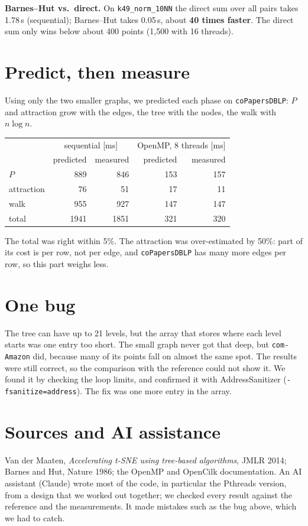 \documentclass[11pt,a4paper]{article}
\newcommand{\code}[1]{\texttt{#1}}
\begin{document}
\textbf{Barnes--Hut vs.\ direct.} On \code{k49\_norm\_10NN} the direct
sum over all pairs takes 1.78\,s (sequential); Barnes--Hut takes
0.05\,s, about \textbf{40 times faster}. The direct sum only wins below
about 400 points (1{,}500 with 16 threads).

\section{Predict, then measure}

Using only the two smaller graphs, we predicted each phase on
\code{coPapersDBLP}: $P$ and attraction grow with the edges, the tree with
the nodes, the walk with $n\log n$.

\begin{center}
\begin{tabular}{lrrrr}
\toprule
 & \multicolumn{2}{c}{sequential [ms]} & \multicolumn{2}{c}{OpenMP, 8 threads [ms]} \\
 & predicted & measured & predicted & measured \\
\midrule
$P$        & 889  & 846  & 153 & 157 \\
attraction & 76   & 51   & 17  & 11  \\
walk       & 955  & 927  & 147 & 147 \\
\midrule
total      & 1941 & 1851 & 321 & 320 \\
\bottomrule
\end{tabular}
\end{center}

The total was right within 5\%. The attraction was over-estimated by
50\%: part of its cost is per row, not per edge, and \code{coPapersDBLP}
has many more edges per row, so this part weighs less.

\section{One bug}

The tree can have up to 21 levels, but the array that stores where each
level starts was one entry too short. The small graph never got that deep,
but \code{com-Amazon} did, because many of its points fall on almost the
same spot. The results were still correct, so the comparison with the
reference could not show it. We found it by checking the loop limits, and
confirmed it with AddressSanitizer (\code{-fsanitize=address}). The fix
was one more entry in the array.

\section{Sources and AI assistance}

Van der Maaten, \emph{Accelerating t-SNE using tree-based algorithms},
JMLR 2014; Barnes and Hut, Nature 1986; the OpenMP and OpenCilk
documentation.
An AI assistant (Claude) wrote most of the code, in particular the
Pthreads version, from a design that we worked out together; we checked
every result against the reference and the measurements. It made
mistakes such as the bug above, which we had to catch.
\end{document}
